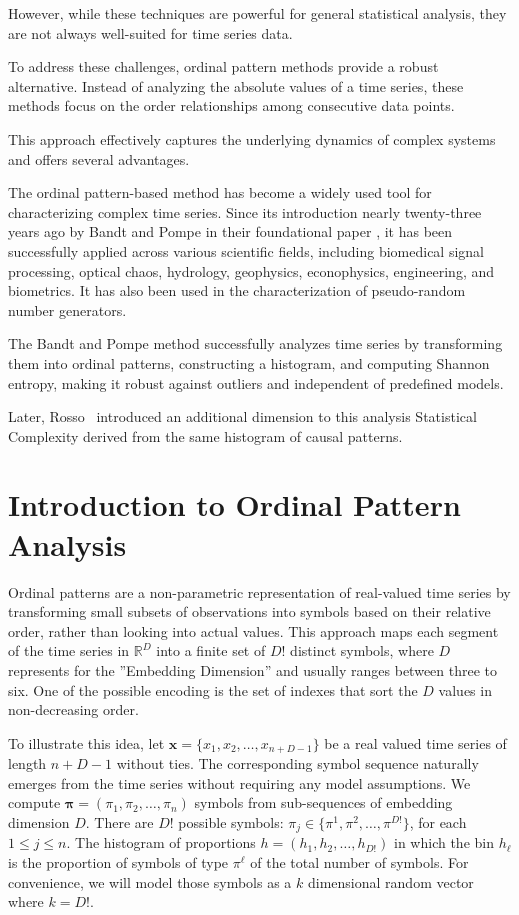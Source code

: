 However, while these techniques are powerful for general statistical analysis, they are not always well-suited for time series data. 

To address these challenges, ordinal pattern methods provide a robust alternative. Instead of analyzing the absolute values of a time series, these methods focus on the order relationships among consecutive data points.

This approach effectively captures the underlying dynamics of complex systems and offers several advantages.

The ordinal pattern-based method has become a widely used tool for characterizing complex time series. Since its introduction nearly twenty-three years ago by Bandt and Pompe in their foundational paper \cite{PhysRevLett.88.174102}, it has been successfully applied across various scientific fields, including biomedical signal processing, optical chaos, hydrology, geophysics, econophysics, engineering, and biometrics. It has also been used in the characterization of pseudo-random number generators.

The Bandt and Pompe method successfully analyzes time series by transforming them into ordinal patterns, constructing a histogram, and computing Shannon entropy, making it robust against outliers and independent of predefined models.

Later, Rosso~\cite{EEGAnalysisUsingWaveletBasedInformationTools} introduced an additional dimension to this analysis Statistical Complexity derived from the same histogram of causal patterns.

\section{Introduction to Ordinal Pattern Analysis}

Ordinal patterns are a non-parametric representation of real-valued time series by transforming small subsets of observations into symbols based on their relative order, rather than looking into actual values. This approach maps each segment of the time series in $\mathbb{R}^D$ into a finite set of $D!$ distinct symbols, where $D$ represents for the ''Embedding Dimension'' and usually ranges between three to six. 
One of the possible encoding is the set of indexes that sort the $D$ values in non-decreasing order.

To illustrate this idea, let $\bm{x}=\{x_1,x_2, \dots, x_{n+D-1}\}$ 
be a real valued time series of length $n+D-1$ without ties. 
The corresponding symbol sequence naturally emerges from the time series without requiring any model assumptions. We compute
$\bm{{\pi}}=({\pi}_1, {\pi}_2,\dots, {\pi}_n)$ symbols from sub-sequences of embedding dimension $D$. 
There are $D!$ possible symbols: $\pi_j \in \{{\pi}^1, {\pi}^2,\dots, {\pi}^{D!}\}$, for each $1\leq j\leq n$.
The histogram of proportions $h=(h_1,h_2,\dots, h_{D!})$ in which the bin $h_\ell$ 
is the proportion of symbols of type $\pi^\ell$ of the total number of symbols. 
For convenience, we will model those symbols as a $k$ dimensional random vector where $k=D!$.

